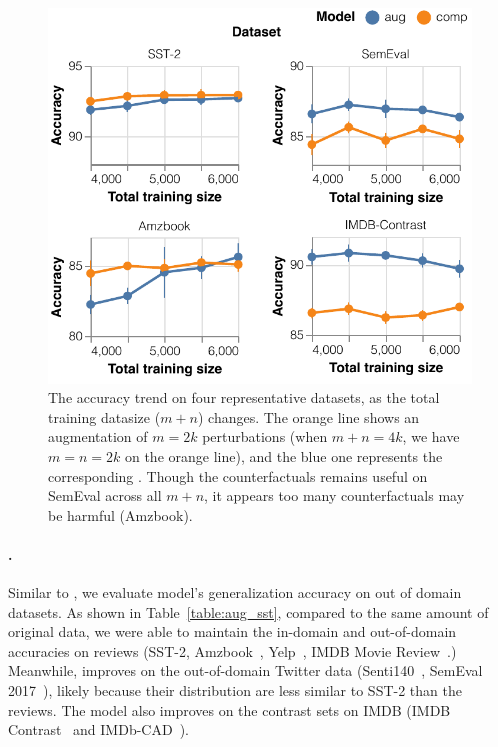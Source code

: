 \begin{figure}[t]
\centering
\includegraphics[width=1\columnwidth]{figures/sst_trend}
\vspace{-15pt}
\caption{The accuracy trend on four representative datasets, as the total training datasize ($m+n$) changes. The orange line shows an augmentation of $m=2k$ perturbations (\eg when $m+n=4k$, we have $m=n=2k$ on the orange line), and the blue one represents the corresponding \mcomp.
Though the counterfactuals remains useful on SemEval across all $m+n$, it appears too many counterfactuals may be harmful (Amzbook).
}
\vspace{-10pt}
\label{fig:sst_trend}
\end{figure}

\paragraph{\sst.}
Similar to \citet{kaushik2019learning}, we evaluate \sst model's generalization accuracy on out of domain datasets.
As shown in Table~\ref{table:aug_sst}, compared to the same amount of original data, we were able to maintain the in-domain and out-of-domain accuracies on reviews (SST-2, Amzbook~\cite{ni2019justifying}, Yelp~\cite{asghar2016yelp}, IMDB Movie Review~\cite{maas2011learning}.)
Meanwhile, \maug improves on the out-of-domain Twitter data (Senti140~\cite{go2009twitter}, SemEval 2017~\cite{rosenthal2017semeval}), likely because their distribution are less similar to SST-2 than the reviews.
The model also improves on the contrast sets on IMDB (IMDB Contrast~\cite{gardner2020contrast} and IMDb-CAD~\cite{kaushik2019learning}).

